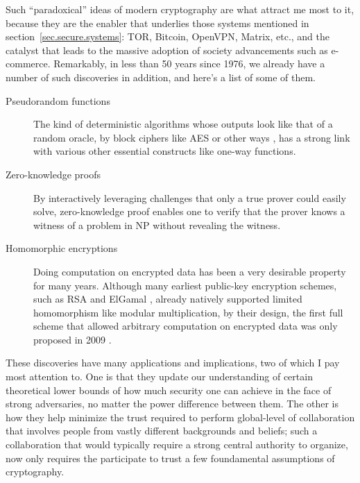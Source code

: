 \documentclass{article}
\begin{document}
Such ``paradoxical'' ideas of modern cryptography are what attract me most to
it, because they are the enabler that underlies those systems mentioned in
section~\ref{sec.secure.systems}: TOR, Bitcoin, OpenVPN, Matrix, etc., and the
catalyst that leads to the massive adoption of society advancements such as
e-commerce. Remarkably, in less than 50 years since 1976, we already have a
number of such discoveries in addition, and here's a list of some of them.
\begin{description}
\item[Pseudorandom functions] The kind of deterministic algorithms
	whose outputs look like that of a random oracle, by block ciphers like
	AES\cite{aes} or other ways \cite{pseudo.rand.cons.2}, has a strong link
	with various other essential constructs like one-way functions.

\item[Zero-knowledge proofs] By interactively leveraging challenges that only a
	true prover could easily solve, zero-knowledge proof \cite{zero.knowledge}
	enables one to verify that the prover knows a witness of a problem in NP
	\cite{zero.knowledge.np} without revealing the witness.

\item[Homomorphic encryptions] Doing computation on encrypted data has been a
	very desirable property for many years. Although many earliest public-key
	encryption schemes, such as RSA \cite{rsa} and ElGamal \cite{elgamal},
	already natively supported limited homomorphism like modular
	multiplication, by their design, the first full scheme that allowed
	arbitrary computation on encrypted data was only proposed in 2009
	\cite{first.full.homo}.
\end{description}

These discoveries have many applications and implications, two of which I pay
most attention to. One is that they update our understanding of certain
theoretical lower bounds of how much security one can achieve in the face of
strong adversaries, no matter the power difference between them. The other is
how they help minimize the trust required to perform global-level of
collaboration that involves people from vastly different backgrounds and
beliefs; such a collaboration that would typically require a strong central
authority to organize, now only requires the participate to trust a few
foundamental assumptions of cryptography.
\end{document}
